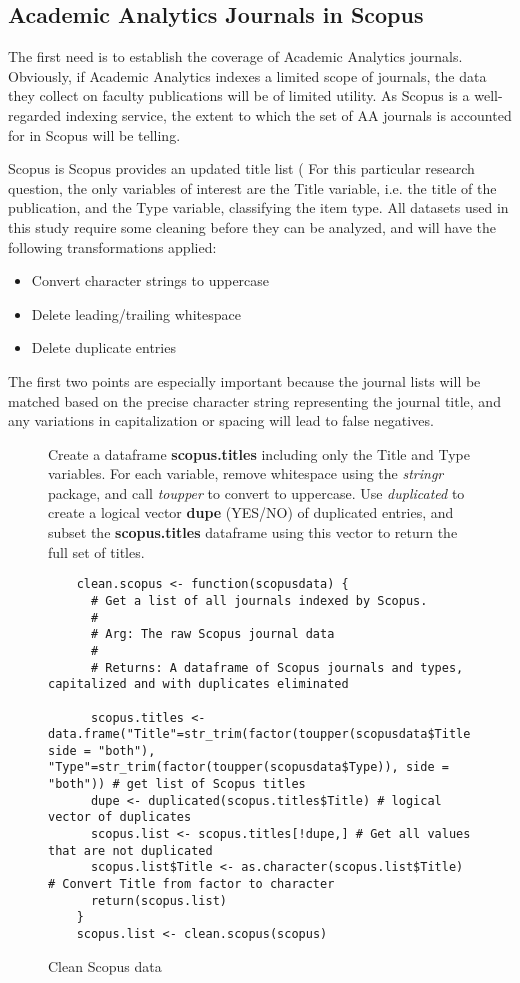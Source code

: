 \documentclass{article}
\begin{document}
\subsection{Academic Analytics Journals in Scopus}
The first need is to establish the coverage of Academic Analytics journals.
Obviously, if Academic Analytics indexes a limited scope of journals, the data they collect on faculty publications will be of limited utility.
As Scopus is a well-regarded indexing service, the extent to which the set of AA journals is accounted for in Scopus will be telling.

Scopus is %
Scopus provides an updated title list (%
For this particular research question, the only variables of interest are the Title variable, i.e. the title of the publication, and the Type variable, classifying the item type.
All datasets used in this study require some cleaning before they can be analyzed, and will have the following transformations applied:
\begin{itemize}
	\item Convert character strings to uppercase
	\item Delete leading/trailing whitespace
	\item Delete duplicate entries
\end{itemize}
The first two points are especially important because the journal lists will be matched based on the precise character string representing the journal title, and any variations in capitalization or spacing will lead to false negatives.
\begin{figure}[ht]
	\centering
	\caption{Clean Scopus data}
	\footnotesize{
		Create a dataframe \textbf{scopus.titles} including only the Title and Type variables.
		For each variable, remove whitespace using the \textit{stringr} package, and call \textit{toupper} to convert to uppercase.
		Use \textit{duplicated} to create a logical vector \textbf{dupe} (YES/NO) of duplicated entries, and subset the \textbf{scopus.titles} dataframe using this vector to return the full set of titles.
			}
	\begin{lstlisting}
	clean.scopus <- function(scopusdata) {
	  # Get a list of all journals indexed by Scopus. 
	  # 
	  # Arg: The raw Scopus journal data
	  # 
	  # Returns: A dataframe of Scopus journals and types, capitalized and with duplicates eliminated
	  
	  scopus.titles <- data.frame("Title"=str_trim(factor(toupper(scopusdata$Title)), side = "both"), "Type"=str_trim(factor(toupper(scopusdata$Type)), side = "both")) # get list of Scopus titles
	  dupe <- duplicated(scopus.titles$Title) # logical vector of duplicates
	  scopus.list <- scopus.titles[!dupe,] # Get all values that are not duplicated
	  scopus.list$Title <- as.character(scopus.list$Title) # Convert Title from factor to character
	  return(scopus.list)
	}
	scopus.list <- clean.scopus(scopus)
\end{lstlisting}
\end{figure}
\end{document}
